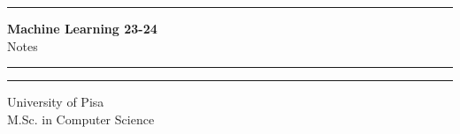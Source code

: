 \documentclass[12pt]{report}
\begin{document}
\begin{titlepage}
\hrule
\vspace{15pt}
\begin{center}
    \Huge{\textbf{\Huge \textbf{Machine Learning 23-24}} \\ Notes}\\
\end{center}
\vspace{15pt}
\hrule
\vfill
\hrule
\begin{center}
    \Large University of Pisa \\ M.Sc. in Computer Science
\end{center}
\end{titlepage}

\tableofcontents









\nocite{*}

\clearpage
\end{document}
